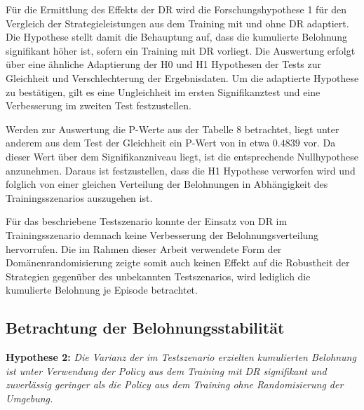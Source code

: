 Für die Ermittlung des Effekts der DR wird die Forschungshypothese 1 für den Vergleich der Strategieleistungen aus dem Training mit und ohne DR adaptiert.
Die Hypothese stellt damit die Behauptung auf, dass die kumulierte Belohnung signifikant höher ist, sofern ein Training mit DR vorliegt.
Die Auswertung erfolgt über eine ähnliche Adaptierung der H0 und H1 Hypothesen der Tests zur Gleichheit und Verschlechterung der Ergebnisdaten.
Um die adaptierte Hypothese zu bestätigen, gilt es eine Ungleichheit im ersten Signifikanztest und eine Verbesserung im zweiten Test festzustellen.

Werden zur Auswertung die P-Werte aus der Tabelle 8 betrachtet, liegt unter anderem aus dem Test der Gleichheit ein P-Wert von in etwa $0.4839$ vor.
Da dieser Wert über dem Signifikanzniveau liegt, ist die entsprechende Nullhypothese anzunehmen.
Daraus ist festzustellen, dass die H1 Hypothese verworfen wird und folglich von einer gleichen Verteilung der Belohnungen in Abhängigkeit des Trainingsszenarios auszugehen ist.

Für das beschriebene Testszenario konnte der Einsatz von DR im Trainingsszenario demnach keine Verbesserung der Belohnungsverteilung hervorrufen.
Die im Rahmen dieser Arbeit verwendete Form der Domänenrandomisierung zeigte somit auch keinen Effekt auf die Robustheit der Strategien gegenüber des unbekannten Testszenarios, wird lediglich die kumulierte Belohnung je Episode betrachtet.

\subsection{Betrachtung der Belohnungsstabilität}

\textbf{Hypothese 2:}
\textit{Die Varianz der im Testszenario erzielten kumulierten Belohnung ist unter Verwendung der Policy aus dem Training mit DR signifikant und zuverlässig geringer als die Policy aus dem Training ohne Randomisierung der Umgebung.}

